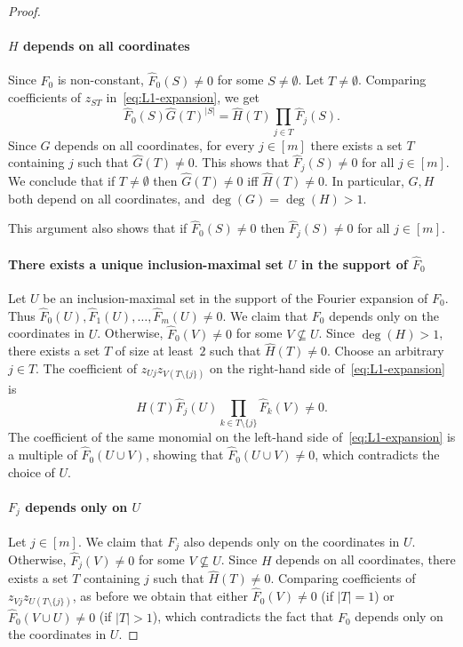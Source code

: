 \documentclass{article}
\theoremstyle{definition}
\theoremstyle{remark}
\begin{document}
\begin{proof}
\paragraph{$H$ depends on all coordinates}
Since $F_0$ is non-constant, $\hat{F}_0(S) \neq 0$ for some $S \neq \emptyset$. Let $T \neq \emptyset$. Comparing coefficients of $z_{ST}$ in~\eqref{eq:L1-expansion}, we get
\[
 \hat{F}_0(S) \hat{G}(T)^{|S|} = \hat{H}(T) \prod_{j \in T} \hat{F}_j(S).
\]
Since $G$ depends on all coordinates, for every $j \in [m]$ there exists a set $T$ containing $j$ such that $\hat{G}(T) \neq 0$. This shows that $\hat{F}_j(S) \neq 0$ for all $j \in [m]$.
We conclude that if $T \neq \emptyset$ then
$\hat{G}(T) \neq 0$ iff $\hat{H}(T) \neq 0$. In particular, $G,H$ both depend on all coordinates, and $\deg(G) = \deg(H) > 1$.

This argument also shows that if $\hat{F}_0(S) \neq 0$ then $\hat{F}_j(S) \neq 0$ for all $j \in [m]$.

\paragraph{There exists a unique inclusion-maximal set $U$ in the support of $\hat{F}_0$}
Let $U$ be an inclusion-maximal set in the support of the Fourier expansion of $F_0$. Thus $\hat{F}_0(U),\hat{F}_1(U),\ldots,\hat{F}_m(U) \neq 0$. We claim that $F_0$ depends only on the coordinates in $U$. Otherwise, $\hat{F}_0(V) \neq 0$ for some $V \nsubseteq U$. Since $\deg(H)>1$, there exists a set $T$ of size at least~$2$ such that $\hat{H}(T) \neq 0$. Choose an arbitrary $j \in T$. The coefficient of $z_{Uj} z_{V(T \setminus \{j\})}$ on the right-hand side of~\eqref{eq:L1-expansion} is
\[
 \hat{H}(T) \hat{F}_j(U) \prod_{k \in T \setminus \{j\}} \hat{F}_k(V) \neq 0.
\]
The coefficient of the same monomial on the left-hand side of~\eqref{eq:L1-expansion} is a multiple of $\hat{F}_0(U \cup V)$, showing that $\hat{F}_0(U \cup V) \neq 0$, which contradicts the choice of $U$.

\paragraph{$F_j$ depends only on $U$}
Let $j \in [m]$. We claim that $F_j$ also depends only on the coordinates in $U$. Otherwise, $\hat{F}_j(V) \neq 0$ for some $V \nsubseteq U$. Since $H$ depends on all coordinates, there exists a set $T$ containing $j$ such that $\hat{H}(T) \neq 0$. Comparing coefficients of $z_{Vj} z_{U(T \setminus \{j\})}$, as before we obtain that either $\hat{F}_0(V) \neq 0$ (if $|T| = 1$) or $\hat{F}_0(V \cup U) \neq 0$ (if $|T| > 1$), which contradicts the fact that $F_0$ depends only on the coordinates in $U$.


\end{proof}
\end{document}
